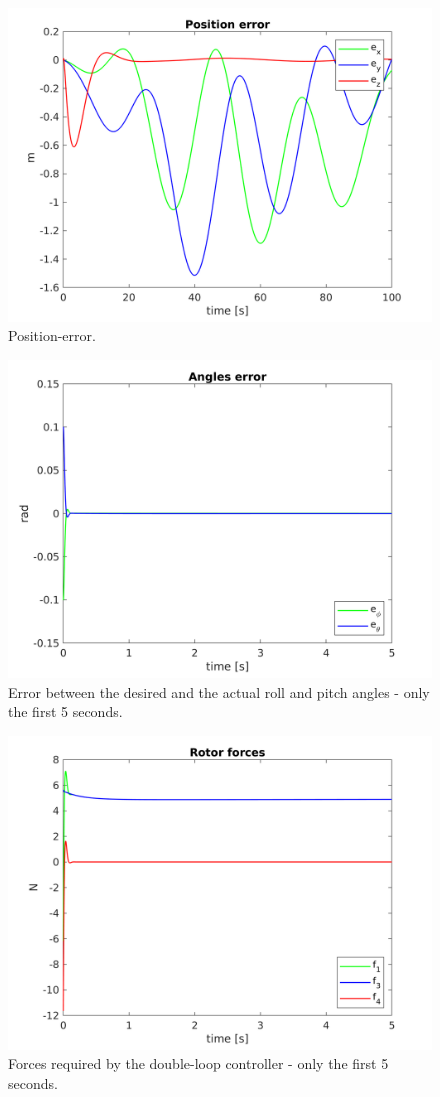 \documentclass[11pt,a4paper]{scrartcl}
\begin{document}
\begin{figure}
	\centering
	\includegraphics[width=0.7\linewidth]{Images/OositionError}
	\caption{Position-error.}
	\label{fig:positionerror}
\end{figure}

\begin{figure}
	\centering
	\includegraphics[width=0.7\linewidth]{Images/Angles_error}
	\caption{Error between the desired and the actual roll and pitch angles - only the first 5 seconds.}
	\label{fig:angles_error}
\end{figure}

\begin{figure}
	\centering
	\includegraphics[width=0.7\linewidth]{Images/Forces}
	\caption{Forces required by the double-loop controller - only the first 5 seconds.}
	\label{fig:forces}
\end{figure}
\end{document}
